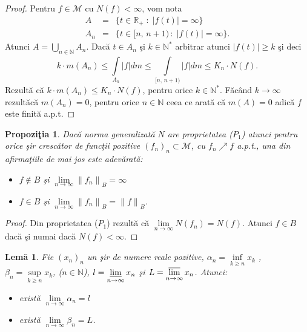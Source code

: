 \documentclass[ a4paper, 12pt]{report}
\newtheorem{prop}[theorem]{\bf Propozi\c tia }
\newtheorem{lema}[theorem]{\bf{Lem\u a}}
\theoremstyle{definition}
\theoremstyle{remark}
\numberwithin{equation}{section}
\begin{document}
\begin{proof} Pentru $f \in \mathcal{M}$ cu $N(f)<\infty$, vom nota
\begin{eqnarray*}
A&=&\{t \in \mathbb{R_+}\; : \; \lvert f(t) \rvert = \infty\}\\
A_n&=&\{t \in [n,\, n+1) \, : \; \lvert f(t) \rvert = \infty\}.
\end{eqnarray*}
Atunci $A=\bigcup\limits_{n \in \mathbb{N}}^{}{A_n}$. Dac\u a $t \in A_n$ \c si $k \in \mathbb{N^*}$ arbitrar atunci
$\lvert f(t) \rvert \geq k$ \c si deci
$$k \cdot m(A_n) \leq \int\limits_{A_n}^{}{\lvert f \rvert} dm \leq \int\limits_{[n,\, n+1)}^{}{\lvert f \rvert} dm \leq K_n \cdot N(f).$$
Rezult\u a c\u a $k \cdot m(A_n) \leq K_n \cdot N(f)$, pentru orice $k \in \mathbb{N^*}$. F\u ac\^ and $k \rightarrow \infty$ rezult\u ac\u a $m(A_n)=0$, pentru orice $n \in \mathbb{N}$ ceea ce arat\u a c\u a $m(A)=0$ adic\u a $f$ este finit\u a a.p.t.
\end{proof}

\begin{prop}
Dac\u a norma generalizat\u a $N$ are proprietatea ($P_1$) atunci pentru orice \c sir cresc\u ator de func\c tii pozitive $(f_n)_n \subset \mathcal{M}$, cu $f_n \nearrow f$ a.p.t.,
una din afirma\c tiile de mai jos este adev\u arat\u a:
\begin{itemize}
\item[(a)] $f \notin B$ \c si $\lim\limits_{n \to \infty}{\lVert f_n \rVert}_B = \infty$

\item[(b)] $f \in B$ \c si $\lim\limits_{n \to \infty}{\lVert f_n \rVert}_B = {\lVert f \rVert}_B$.
\end{itemize}
\end{prop}

\begin{proof}
Din proprietatea ($P_1$) rezult\u a c\u a $\lim\limits_{n \to \infty} N(f_n) = N(f)$. Atunci $f \in B$ dac\u a \c si numai dac\u a $N(f)<\infty$.
\end{proof}

\begin{lema}
Fie $(x_n)_n$ un \c sir de numere reale pozitive, $\alpha_n =\inf\limits_{k \geq n} x_k$ , $\beta_n = \sup\limits_{k \geq n} x_k$, ($n \in \mathbb{N}$),
$l = \varliminf\limits_{n \rightarrow \infty} x_n$ \c si $L= \varlimsup\limits_{n \to \infty} x_n$. Atunci:
\begin{itemize}
\item[(i)] exist\u a $\lim\limits_{n \rightarrow \infty}\alpha_n = l$
\item[(ii)] exist\u a $\lim\limits_{n \rightarrow \infty}\beta_n = L$.
\end{itemize}
\end{lema}
\end{document}
